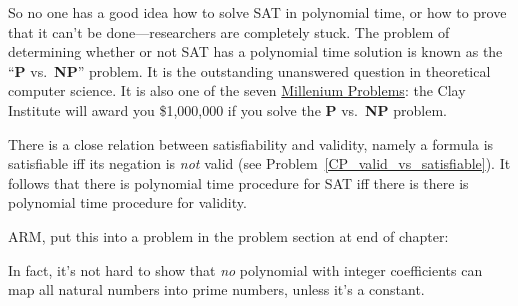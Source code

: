So no one has a good idea how to solve SAT in polynomial time, or how
to prove that it can't be done---researchers are completely stuck.
The problem of determining whether or not SAT has a polynomial time
solution is known as the ``\textbf{P} vs.\ \textbf{NP}'' problem.  It
is the outstanding unanswered question in theoretical computer
science.  It is also one of the
seven \href{http://www.claymath.org/millennium/}{Millenium Problems}:
the Clay Institute will award you \$1,000,000 if you solve
the \textbf{P} vs.\ \textbf{NP} problem.

There is a close relation between satisfiability and validity, namely a
formula is satisfiable iff its negation is \emph{not} valid (see
Problem~\ref{CP_valid_vs_satisfiable}).  It follows that there is polynomial time
procedure for SAT iff there is there is polynomial time
procedure for validity.

\begin{problems}
\classproblems
{}
\end{problems}

\begin{editingnotes}
ARM, put this into a problem in the problem section at end of chapter:

In fact, it's not hard to show that \emph{no} polynomial
with integer coefficients can map all natural numbers into prime
numbers, unless it's a constant.
\end{editingnotes}

\endinput


